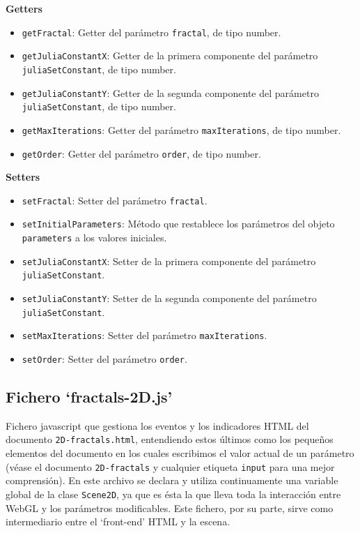 \pagebreak
\textbf{Getters}
\begin{itemize}
    \item \verb|getFractal|: Getter del parámetro \verb|fractal|, de tipo number.
    \item \verb|getJuliaConstantX|: Getter de la primera componente del parámetro \verb|juliaSetConstant|, de tipo number.
    \item \verb|getJuliaConstantY|: Getter de la segunda componente del parámetro \verb|juliaSetConstant|, de tipo number.
    \item \verb|getMaxIterations|: Getter del parámetro \verb|maxIterations|, de tipo number.
    \item \verb|getOrder|: Getter del parámetro \verb|order|, de tipo number.
\end{itemize}
\textbf{Setters}
\begin{itemize}
    \item \verb|setFractal|: Setter del parámetro \verb|fractal|.
    \item \verb|setInitialParameters|: Método que restablece los parámetros del objeto \verb|parameters| a los valores iniciales.
    \item \verb|setJuliaConstantX|: Setter de la primera componente del parámetro \verb|juliaSetConstant|.
    \item \verb|setJuliaConstantY|: Setter de la segunda componente del parámetro \verb|juliaSetConstant|.
    \item \verb|setMaxIterations|: Setter del parámetro \verb|maxIterations|.
    \item \verb|setOrder|: Setter del parámetro \verb|order|.
\end{itemize}

\subsection{Fichero `fractals-2D.js'}

Fichero javascript que gestiona los eventos y los indicadores HTML del documento \verb|2D-fractals.html|, entendiendo estos últimos como los pequeños elementos del documento en los cuales escribimos el valor actual de un parámetro (véase el documento \verb|2D-fractals| y cualquier etiqueta \verb|input| para una mejor comprensión). En este archivo se declara y utiliza continuamente una variable global de la clase \verb|Scene2D|, ya que es ésta la que lleva toda la interacción entre WebGL y los parámetros modificables. Este fichero, por su parte, sirve como intermediario entre el `front-end' HTML y la escena.

